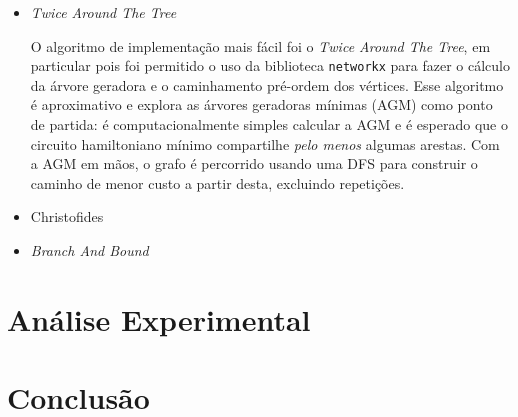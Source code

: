 \documentclass{article}
\begin{document}
\begin{itemize}

	\item \textit{Twice Around The Tree}

	      O algoritmo de implementação mais fácil foi o \textit{Twice Around The Tree}, em particular pois foi permitido o uso da biblioteca \texttt{networkx} para fazer o cálculo da árvore geradora e o caminhamento pré-ordem dos vértices. Esse algoritmo é aproximativo e explora as árvores geradoras mínimas (AGM) como ponto de partida: é computacionalmente simples calcular a AGM e é esperado que o circuito hamiltoniano mínimo compartilhe \textit{pelo menos} algumas arestas. Com a AGM em mãos, o grafo é percorrido usando uma DFS para construir o caminho de menor custo a partir desta, excluindo repetições.

	\item Christofides

	\item \textit{Branch And Bound}

\end{itemize}

\section{Análise Experimental}

\section{Conclusão}

\end{document}

